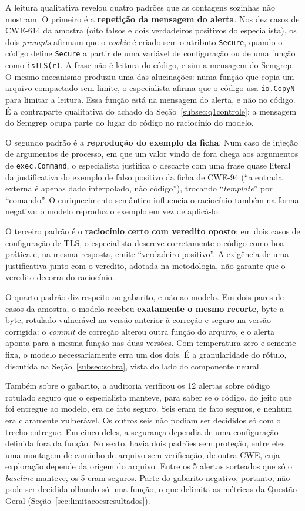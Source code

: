 A leitura qualitativa revelou quatro padrões que as contagens sozinhas não mostram. O primeiro é a \textbf{repetição da mensagem do alerta}. Nos dez casos de CWE-614 da amostra (oito falsos e dois verdadeiros positivos do especialista), os dois \textit{prompts} afirmam que o \textit{cookie} é criado sem o atributo \texttt{Secure}, quando o código define \texttt{Secure} a partir de uma variável de configuração ou de uma função como \texttt{isTLS(r)}. A frase não é leitura do código, e sim a mensagem do Semgrep. O mesmo mecanismo produziu uma das alucinações: numa função que copia um arquivo compactado sem limite, o especialista afirma que o código usa \texttt{io.CopyN} para limitar a leitura. Essa função está na mensagem do alerta, e não no código. É a contraparte qualitativa do achado da Seção~\ref{subsec:q1controle}: a mensagem do Semgrep ocupa parte do lugar do código no raciocínio do modelo.

O segundo padrão é a \textbf{reprodução do exemplo da ficha}. Num caso de injeção de argumentos de processo, em que um valor vindo de fora chega aos argumentos de \texttt{exec.Command}, o especialista justifica o descarte com uma frase quase literal da justificativa do exemplo de falso positivo da ficha de CWE-94 (``a entrada externa é apenas dado interpolado, não código''), trocando ``\textit{template}'' por ``comando''. O enriquecimento semântico influencia o raciocínio também na forma negativa: o modelo reproduz o exemplo em vez de aplicá-lo.

O terceiro padrão é o \textbf{raciocínio certo com veredito oposto}: em dois casos de configuração de TLS, o especialista descreve corretamente o código como boa prática e, na mesma resposta, emite ``verdadeiro positivo''. A exigência de uma justificativa junto com o veredito, adotada na metodologia, não garante que o veredito decorra do raciocínio.

O quarto padrão diz respeito ao gabarito, e não ao modelo. Em dois pares de casos da amostra, o modelo recebeu \textbf{exatamente o mesmo recorte}, byte a byte, rotulado vulnerável na versão anterior à correção e seguro na versão corrigida: o \textit{commit} de correção alterou outra função do arquivo, e o alerta aponta para a mesma função nas duas versões. Com temperatura zero e semente fixa, o modelo necessariamente erra um dos dois. É a granularidade do rótulo, discutida na Seção~\ref{subsec:sobra}, vista do lado do componente neural.

Também sobre o gabarito, a auditoria verificou os 12 alertas sobre código rotulado seguro que o especialista manteve, para saber se o código, do jeito que foi entregue ao modelo, era de fato seguro. Seis eram de fato seguros, e nenhum era claramente vulnerável. Os outros seis não podiam ser decididos só com o trecho entregue. Em cinco deles, a segurança dependia de uma configuração definida fora da função. No sexto, havia dois padrões sem proteção, entre eles uma montagem de caminho de arquivo sem verificação, de outra CWE, cuja exploração depende da origem do arquivo. Entre os 5 alertas sorteados que só o \textit{baseline} manteve, os 5 eram seguros. Parte do gabarito negativo, portanto, não pode ser decidida olhando só uma função, o que delimita as métricas da Questão Geral (Seção~\ref{sec:limitacoesresultados}).


